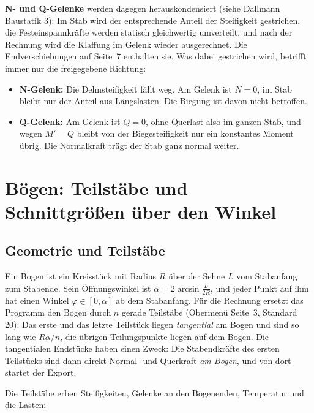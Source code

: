\textbf{N- und Q-Gelenke} werden dagegen herauskondensiert (siehe Dallmann Baustatik 3): Im Stab wird der entsprechende Anteil
der Steifigkeit gestrichen, die Festeinspannkräfte werden statisch gleichwertig
umverteilt, und nach der Rechnung wird die Klaffung im Gelenk wieder ausgerechnet. Die
Endverschiebungen auf Seite~7 enthalten sie. Was dabei gestrichen wird, betrifft immer nur die
freigegebene Richtung:

\begin{itemize}
  \item \textbf{N-Gelenk:} Die Dehnsteifigkeit fällt weg. Am Gelenk ist $N = 0$, im Stab bleibt
        nur der Anteil aus Längslasten. Die Biegung ist davon nicht betroffen.
  \item \textbf{Q-Gelenk:} Am Gelenk ist $Q = 0$, ohne Querlast also im ganzen Stab, und wegen
        $M' = Q$ bleibt von der Biegesteifigkeit nur ein konstantes Moment übrig. Die Normalkraft
        trägt der Stab ganz normal weiter.
\end{itemize}

\section{Bögen: Teilstäbe und Schnittgrößen über den Winkel}\label{sec:mathe-bogen}

\subsection{Geometrie und Teilstäbe}

Ein Bogen ist ein Kreisstück mit Radius $R$ über der Sehne $L$ vom Stabanfang zum Stabende. Sein
Öffnungswinkel ist $\alpha = 2\arcsin\frac{L}{2R}$, und jeder Punkt auf ihm hat einen Winkel
$\varphi \in [0, \alpha]$ ab dem Stabanfang. Für die Rechnung ersetzt das Programm den Bogen durch
$n$ gerade Teilstäbe (Obermenü Seite~3, Standard 20). Das erste und das letzte Teilstück liegen
\emph{tangential} am Bogen und sind so lang wie $R\alpha/n$, die übrigen Teilungspunkte liegen auf
dem Bogen. Die tangentialen Endstücke haben einen Zweck: Die Stabendkräfte des ersten Teilstücks
sind dann direkt Normal- und Querkraft \emph{am Bogen}, und von dort startet der Export.

Die Teilstäbe erben Steifigkeiten, Gelenke an den Bogenenden, Temperatur und die Lasten:


